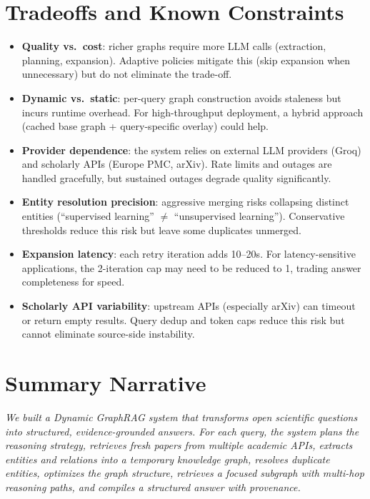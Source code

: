 \documentclass[11pt]{article}
\begin{document}
\section{Tradeoffs and Known Constraints}

\begin{itemize}[leftmargin=1.2em]
  \item \textbf{Quality vs.\ cost}: richer graphs require more LLM calls (extraction, planning, expansion). Adaptive policies mitigate this (skip expansion when unnecessary) but do not eliminate the trade-off.
  \item \textbf{Dynamic vs.\ static}: per-query graph construction avoids staleness but incurs runtime overhead. For high-throughput deployment, a hybrid approach (cached base graph + query-specific overlay) could help.
  \item \textbf{Provider dependence}: the system relies on external LLM providers (Groq) and scholarly APIs (Europe PMC, arXiv). Rate limits and outages are handled gracefully, but sustained outages degrade quality significantly.
  \item \textbf{Entity resolution precision}: aggressive merging risks collapsing distinct entities (``supervised learning'' $\neq$ ``unsupervised learning''). Conservative thresholds reduce this risk but leave some duplicates unmerged.
  \item \textbf{Expansion latency}: each retry iteration adds 10--20s. For latency-sensitive applications, the 2-iteration cap may need to be reduced to 1, trading answer completeness for speed.
  \item \textbf{Scholarly API variability}: upstream APIs (especially arXiv) can timeout or return empty results. Query dedup and token caps reduce this risk but cannot eliminate source-side instability.
\end{itemize}

\section{Summary Narrative}

\textit{We built a Dynamic GraphRAG system that transforms open scientific questions into structured, evidence-grounded answers. For each query, the system plans the reasoning strategy, retrieves fresh papers from multiple academic APIs, extracts entities and relations into a temporary knowledge graph, resolves duplicate entities, optimizes the graph structure, retrieves a focused subgraph with multi-hop reasoning paths, and compiles a structured answer with provenance.}
\end{document}
